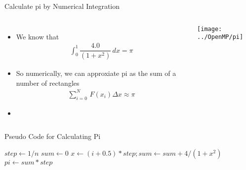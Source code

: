 \documentclass[c,mathserif,compress,xcolor=svgnames]{beamer}
\begin{document}
\begin{frame}[allowframebreaks]{Calculate pi by Numerical Integration}
  \begin{columns}
    \column{5cm}
    \begin{itemize}
      \item We know that
      \begin{align*}
        \int^1_0 \dfrac{4.0}{(1+x^2)}\, dx = \pi
      \end{align*}
      \item So numerically, we can approxiate pi as the sum of a number of rectangles
      \begin{align*}
        \sum^N_{i=0}\,F(x_i)\Delta x \approx \pi
      \end{align*}
      \item[] 
    \end{itemize}
    \column{5cm}
    \begin{center}
      \texttt{[image: ../OpenMP/pi]}
    \end{center}
  \end{columns}

  \begin{algorithm}[H]
    \caption{Pseudo Code for Calculating Pi}
    \begin{algorithmic}
        \State $step \gets 1/n$
        \State $sum \gets 0$
        \State $x \gets (i+0.5)*step; sum \gets sum + 4/(1+x^2)$
        \EndDo
        \State $pi \gets sum * step$
        \EndFunction
    \end{algorithmic}
  \end{algorithm}
\end{frame}
\end{document}
